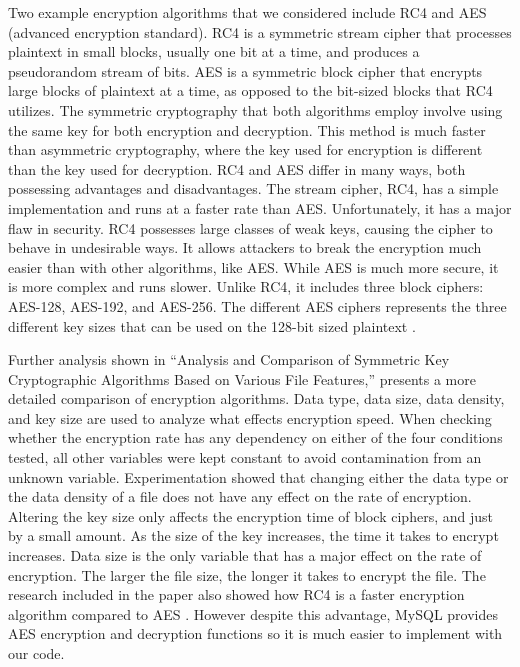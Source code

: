\documentclass[twocolumn,12pt]{article}
\begin{document}
Two example encryption algorithms that we considered include RC4 and AES (advanced encryption standard). RC4 is a symmetric stream cipher that processes plaintext in small blocks, usually one bit at a time, and produces a pseudorandom stream of bits. AES is a symmetric block cipher that encrypts large blocks of plaintext at a time, as opposed to the bit-sized blocks that RC4 utilizes. The symmetric cryptography that both algorithms employ involve using the same key for both encryption and decryption. This method is much faster than asymmetric cryptography, where the key used for encryption is different than the key used for decryption. RC4 and AES differ in many ways, both possessing advantages and disadvantages. The stream cipher, RC4, has a simple implementation and runs at a faster rate than AES. Unfortunately, it has a major flaw in security. RC4 possesses large classes of weak keys, causing the cipher to behave in undesirable ways. It allows attackers to break the encryption much easier than with other algorithms, like AES. While AES is much more secure, it is more complex and runs slower. Unlike RC4, it includes three block ciphers: AES-128, AES-192, and AES-256. The different AES ciphers represents the three different key sizes that can be used on the 128-bit sized plaintext \cite{rc4} \cite{aes}.

Further analysis shown in ``Analysis and Comparison of Symmetric Key Cryptographic Algorithms Based on Various File Features,” presents a more detailed comparison of encryption algorithms. Data type, data size, data density, and key size are used to analyze what effects encryption speed. When checking whether the encryption rate has any dependency on either of the four conditions tested, all other variables were kept constant to avoid contamination from an unknown variable. Experimentation showed that changing either the data type or the data density of a file does not have any effect on the rate of encryption. Altering the key size only affects the encryption time of block ciphers, and just by a small amount. As the size of the key increases, the time it takes to encrypt increases. Data size is the only variable that has a major effect on the rate of encryption. The larger the file size, the longer it takes to encrypt the file. The research included in the paper also showed how RC4 is a faster encryption algorithm compared to AES \cite{encryption}. However despite this advantage, MySQL provides AES encryption and decryption functions so it is much easier to implement with our code.
\end{document}
